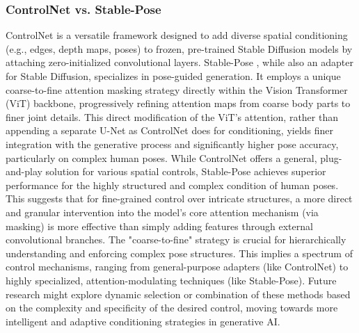 \documentclass[a4paper]{article}
\begin{document}
\subsubsection*{ControlNet vs. Stable-Pose}
ControlNet \cite{Zhang2023ControlNet} is a versatile framework designed to add diverse spatial conditioning (e.g., edges, depth maps, poses) to frozen, pre-trained Stable Diffusion models by attaching zero-initialized convolutional layers. Stable-Pose \cite{Wang2024StablePose}, while also an adapter for Stable Diffusion, specializes in pose-guided generation. It employs a unique coarse-to-fine attention masking strategy directly within the Vision Transformer (ViT) backbone, progressively refining attention maps from coarse body parts to finer joint details. This direct modification of the ViT's attention, rather than appending a separate U-Net as ControlNet does for conditioning, yields finer integration with the generative process and significantly higher pose accuracy, particularly on complex human poses. While ControlNet offers a general, plug-and-play solution for various spatial controls, Stable-Pose achieves superior performance for the highly structured and complex condition of human poses. This suggests that for fine-grained control over intricate structures, a more direct and granular intervention into the model's core attention mechanism (via masking) is more effective than simply adding features through external convolutional branches. The "coarse-to-fine" strategy is crucial for hierarchically understanding and enforcing complex pose structures. This implies a spectrum of control mechanisms, ranging from general-purpose adapters (like ControlNet) to highly specialized, attention-modulating techniques (like Stable-Pose). Future research might explore dynamic selection or combination of these methods based on the complexity and specificity of the desired control, moving towards more intelligent and adaptive conditioning strategies in generative AI.
\end{document}
